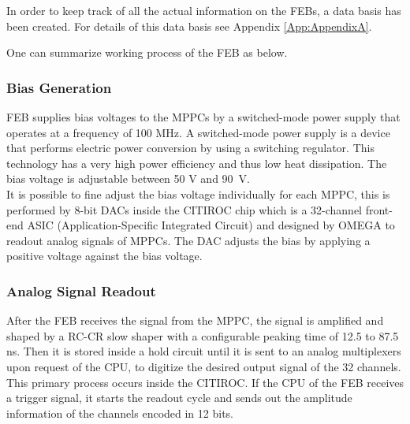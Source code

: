 \documentclass[a4paper]{article}\linespread{1.4}
\begin{document}
In order to keep track of all the actual information on the FEBs, a data basis has been created. For details of this data basis see Appendix \ref{App:AppendixA}.

One can summarize working process of the FEB as below.

\subsubsection{Bias Generation}
FEB supplies bias voltages to the MPPCs by a switched-mode power supply that operates at a frequency of 100 MHz. A switched-mode power supply is a device that performs electric power conversion by using a switching regulator. This technology has a very high power efficiency and thus low heat dissipation. The bias voltage is adjustable between 50 V and 90~V. 
\\It is possible to fine adjust the bias voltage individually for each MPPC, this is performed by 8-bit DACs inside the CITIROC chip which is a 32-channel front-end ASIC (Application-Specific Integrated Circuit) and designed by OMEGA \cite{omega} to readout analog signals of MPPCs. The DAC adjusts the bias by applying a positive voltage against the bias voltage.

\subsubsection{Analog Signal Readout}
After the FEB receives the signal from the MPPC, the signal is amplified and shaped by a RC-CR slow shaper with a configurable peaking time of 12.5 to 87.5 ns. Then it is stored inside a hold circuit until it is sent to an analog multiplexers upon request of the CPU, to digitize the desired output signal of the 32 channels. This primary process occurs inside the CITIROC. If the CPU of the FEB receives a trigger signal, it starts the readout cycle and sends out the amplitude information of the channels encoded in 12 bits.
\end{document}
